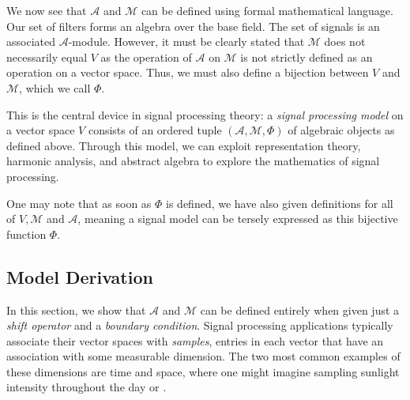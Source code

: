 \documentclass[12pt,technote]{IEEEtran}
\begin{document}
We now see that $\mathcal{A}$ and $\mathcal{M}$ can be defined using formal mathematical language. Our set of filters forms an algebra over the base field. The set of signals is an associated $\mathcal{A}$-module. However, it must be clearly stated that $\mathcal{M}$ does not necessarily equal $V$ as the operation of $\mathcal{A}$ on $\mathcal{M}$ is not strictly defined as an operation on a vector space. Thus, we must also define a bijection between $V$ and $\mathcal{M}$, which we call $\Phi$.

This is the central device in signal processing theory: a \textit{signal processing model} on a vector space $V$ consists of an ordered tuple $(\mathcal{A}, \mathcal{M}, \Phi)$ of algebraic objects as defined above. Through this model, we can exploit representation theory, harmonic analysis, and abstract algebra to explore the mathematics of signal processing.

One may note that as soon as $\Phi$ is defined, we have also given definitions for all of $V, \mathcal{M}$ and $\mathcal{A}$, meaning a signal model can be tersely expressed as this bijective function $\Phi$.
\subsection{Model Derivation}
In this section, we show that $\mathcal{A}$ and $\mathcal{M}$ can be defined entirely when given just a \textit{shift operator} and a \textit{boundary condition}. Signal processing applications typically associate their vector spaces with \textit{samples}, entries in each vector that have an association with some measurable dimension. The two most common examples of these dimensions are time and space, where one might imagine sampling sunlight intensity throughout the day or .
\end{document}
